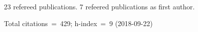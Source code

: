 23 refereed publications. 7 refeered publications as first author.

               Total citations~=~429; h-index~=~9 (2018-09-22)
